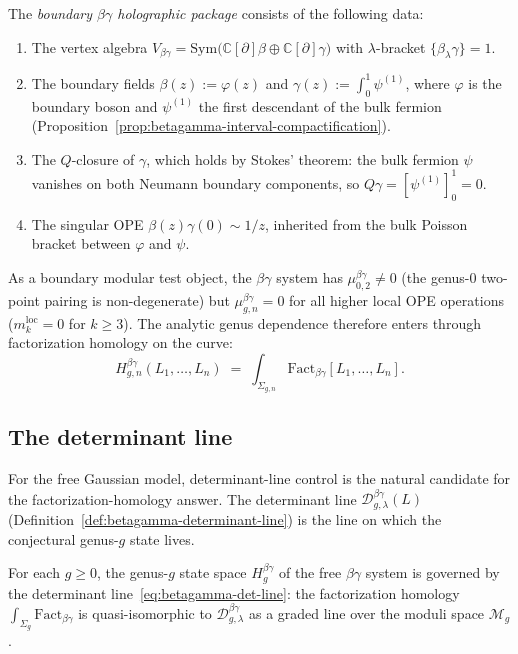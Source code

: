 \begin{definition}
\label{def:betagamma-holographic-package}
The \emph{boundary $\beta\gamma$ holographic package} consists of the
following data:
\begin{enumerate}
\item The vertex algebra
 $V_{\beta\gamma} = \mathrm{Sym}\bigl(\mathbb{C}[\partial]\beta
 \oplus \mathbb{C}[\partial]\gamma\bigr)$ with
 $\lambda$-bracket $\{\beta_\lambda \gamma\} = 1$.
\item The boundary fields
 $\beta(z) := \varphi(z)$ and
 $\gamma(z) := \int_0^1 \psi^{(1)}$,
 where $\varphi$ is the boundary boson and $\psi^{(1)}$ the first
 descendant of the bulk fermion (Proposition~\ref{prop:betagamma-interval-compactification}).
\item The $Q$-closure of $\gamma$, which holds by Stokes' theorem:
 the bulk fermion $\psi$ vanishes on both Neumann boundary
 components, so $Q\gamma = [\psi^{(1)}]_0^1 = 0$.
\item The singular OPE $\beta(z)\gamma(0) \sim 1/z$, inherited from
 the bulk Poisson bracket between $\varphi$ and $\psi$.
\end{enumerate}
As a boundary modular test object, the $\beta\gamma$ system has
$\mu_{0,2}^{\beta\gamma} \neq 0$ (the genus-$0$ two-point pairing is
non-degenerate) but $\mu_{g,n}^{\beta\gamma} = 0$ for all higher local
OPE operations ($m_k^{\mathrm{loc}} = 0$ for $k \geq 3$). The
analytic genus dependence therefore enters through factorization
homology on the curve:
\begin{equation}\label{eq:betagamma-state-spaces}
 H_{g,n}^{\beta\gamma}(L_1, \ldots, L_n)
 \;=\;
 \int_{\Sigma_{g,n}} \mathrm{Fact}_{\beta\gamma}[L_1, \ldots, L_n].
\end{equation}
\end{definition}

\subsection{The determinant line}

For the free Gaussian model, determinant-line control is the natural
candidate for the factorization-homology answer. The determinant line
$\mathcal{D}_{g,\lambda}^{\beta\gamma}(L)$
(Definition~\ref{def:betagamma-determinant-line})
is the line on which the conjectural genus-$g$ state lives.

\begin{conjecture}
\label{conj:betagamma-determinant-control}
For each $g \geq 0$, the genus-$g$ state space $H_g^{\beta\gamma}$
of the free $\beta\gamma$ system is governed by the determinant
line~\eqref{eq:betagamma-det-line}: the factorization homology
$\int_{\Sigma_g} \mathrm{Fact}_{\beta\gamma}$ is quasi-isomorphic to
$\mathcal{D}_{g,\lambda}^{\beta\gamma}$
as a graded line over the moduli space $\mathcal{M}_g$.
\end{conjecture}

